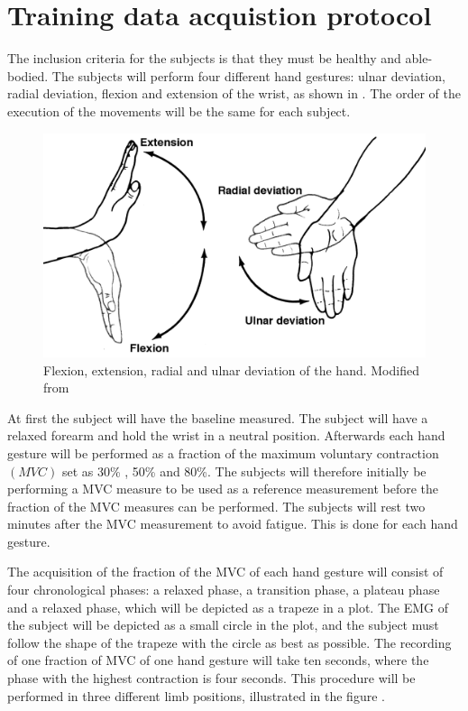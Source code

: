 \section{Training data acquistion protocol} \label{sec:protocol}

The inclusion criteria for the subjects is that they must be healthy and able-bodied. The subjects will perform four different hand gestures: ulnar deviation, radial deviation, flexion and extension of the wrist, as shown in . The order of the execution of the movements will be the same for each subject.

\begin{figure}[H]
	\includegraphics[width=.5\textwidth]{figures/Anatomy/wrist_move}  %
	\caption{Flexion, extension, radial and ulnar deviation of the hand. Modified from  \cite{hamilton2008}}
	\label{fig:handgest}  %
\end{figure}

At first the subject will have the baseline measured. The subject will have a relaxed forearm and hold the wrist in a neutral position. Afterwards each hand gesture will be performed as a fraction of the maximum voluntary contraction $\left( MVC\right)$ set as 30\% , 50\% and 80\%. The subjects will therefore initially be performing a MVC measure to be used as a reference measurement before the fraction of the MVC measures can be performed. The subjects will rest two minutes after the MVC measurement to avoid fatigue. This is done for each hand gesture. 

The acquisition of the fraction of the MVC of each hand gesture will consist of four chronological phases: a relaxed phase, a transition phase, a plateau phase and a relaxed phase, which will be depicted as a trapeze in a plot. The EMG of the subject will be depicted as a small circle in the plot, and the subject must follow the shape of the trapeze with the circle as best as possible. The recording of one fraction of MVC of one hand gesture will take ten seconds, where the phase with the highest contraction is four seconds. 
This procedure will be performed in three different limb positions, illustrated in the figure .

